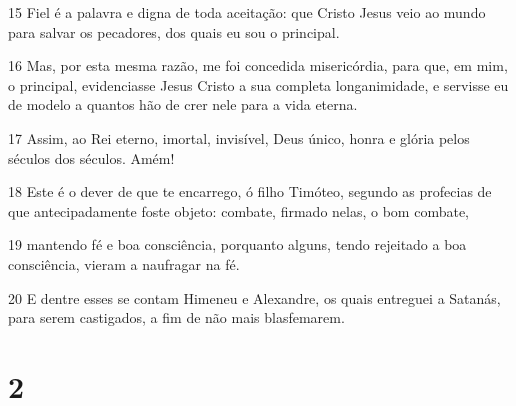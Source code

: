 \par 15 Fiel é a palavra e digna de toda aceitação: que Cristo Jesus veio ao mundo para salvar os pecadores, dos quais eu sou o principal.
\par 16 Mas, por esta mesma razão, me foi concedida misericórdia, para que, em mim, o principal, evidenciasse Jesus Cristo a sua completa longanimidade, e servisse eu de modelo a quantos hão de crer nele para a vida eterna.
\par 17 Assim, ao Rei eterno, imortal, invisível, Deus único, honra e glória pelos séculos dos séculos. Amém!
\par 18 Este é o dever de que te encarrego, ó filho Timóteo, segundo as profecias de que antecipadamente foste objeto: combate, firmado nelas, o bom combate,
\par 19 mantendo fé e boa consciência, porquanto alguns, tendo rejeitado a boa consciência, vieram a naufragar na fé.
\par 20 E dentre esses se contam Himeneu e Alexandre, os quais entreguei a Satanás, para serem castigados, a fim de não mais blasfemarem.

\chapter{2}

